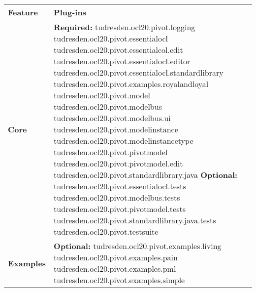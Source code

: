 \begin{table}[h]
\begin{tabular}{|p{4cm}|p{10cm}|}
    \hline
    \textbf{Feature} & \textbf{Plug-ins} \\
    \hline

    \textbf{Core} & 
    \textbf{Required:}\newline
    tudresden.ocl20.pivot.logging\newline
    tudresden.ocl20.pivot.essentialocl\newline
    tudresden.ocl20.pivot.essentialcol.edit\newline
    tudresden.ocl20.pivot.essentialocl.editor\newline
    tudresden.ocl20.pivot.essentialocl.standardlibrary\newline
    tudresden.ocl20.pivot.examples.royalandloyal\newline
    tudresden.ocl20.pivot.model\newline
    tudresden.ocl20.pivot.modelbus\newline
    tudresden.ocl20.pivot.modelbus.ui\newline
    tudresden.ocl20.pivot.modelinstance\newline
    tudresden.ocl20.pivot.modelinstancetype\newline
    tudresden.ocl20.pivot.pivotmodel\newline
    tudresden.ocl20.pivot.pivotmodel.edit\newline
    tudresden.ocl20.pivot.standardlibrary.java\newline\newline
    \textbf{Optional:}\newline
    tudresden.ocl20.pivot.essentialocl.tests\newline
    tudresden.ocl20.pivot.modelbus.tests\newline
    tudresden.ocl20.pivot.pivotmodel.tests\newline
    tudresden.ocl20.pivot.standardlibrary.java.tests\newline
    tudresden.ocl20.pivot.testsuite\\
    \hline

    \textbf{Examples} &
    \textbf{Optional:}\newline
    tudresden.ocl20.pivot.examples.living\newline
    tudresden.ocl20.pivot.examples.pain\newline
    tudresden.ocl20.pivot.examples.pml\newline
    tudresden.ocl20.pivot.examples.simple\\
    \hline


\end{tabular}
\end{table}
